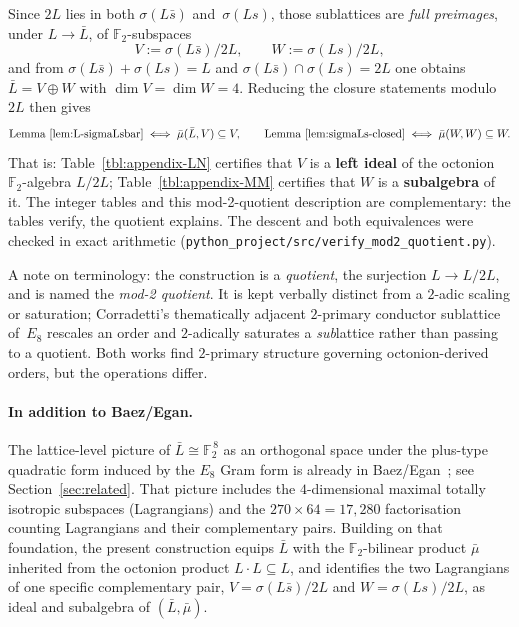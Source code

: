 \documentclass[twoside,english]{paper}
\numberwithin{equation}{section}
\numberwithin{figure}{section}
\theoremstyle{definition}
\theoremstyle{remark}
\newcommand{\FF}{\mathbb{F}}
\begin{document}
Since $2L$ lies in both $\sigma(L\bar s)$ and~$\sigma(Ls)$, those
sublattices are \emph{full preimages}, under $L \to \bar L$, of
$\FF_2$-subspaces
\[
  V := \sigma(L\bar s)/2L, \qquad W := \sigma(Ls)/2L,
\]
and from $\sigma(L\bar s) + \sigma(Ls) = L$ and
$\sigma(L\bar s) \cap \sigma(Ls) = 2L$ one obtains $\bar L = V \oplus
W$ with $\dim V = \dim W = 4$.  Reducing the closure statements
modulo~$2L$ then gives
\[
  \text{Lemma~\ref{lem:L-sigmaLsbar}} \iff
    \bar\mu(\bar L, V) \subseteq V, \qquad
  \text{Lemma~\ref{lem:sigmaLs-closed}} \iff
    \bar\mu(W, W) \subseteq W.
\]
That is: Table~\ref{tbl:appendix-LN} certifies that $V$ is a
\textbf{left ideal} of the octonion $\FF_2$-algebra $L/2L$;
Table~\ref{tbl:appendix-MM} certifies that $W$ is a
\textbf{subalgebra} of it.  The integer tables and this mod-2-quotient
description are complementary: the tables verify, the quotient
explains.  The descent and both equivalences were checked in exact
arithmetic
(\texttt{python\_project/src/verify\_mod2\_quotient.py}).

A note on terminology: the construction is a \emph{quotient}, the
surjection $L \to L/2L$, and is named the \emph{mod-2 quotient}.  It
is kept verbally distinct from a $2$-adic scaling or saturation;
Corradetti's \cite{Corradetti2026} thematically adjacent $2$-primary
conductor sublattice of~$E_8$ rescales an order and $2$-adically
saturates a \emph{sub}lattice rather than passing to a quotient.
Both works find $2$-primary structure governing octonion-derived
orders, but the operations differ.

\paragraph{In addition to Baez/Egan.}
The lattice-level picture of $\bar L \cong \FF_2^{\,8}$ as an
orthogonal space under the plus-type quadratic form induced by the
$E_8$ Gram form is already in Baez/Egan~\cite{Baez2014}; see
Section~\ref{sec:related}.  That picture includes the
$4$-dimensional maximal totally isotropic subspaces (Lagrangians)
and the $270 \times 64 = 17{,}280$ factorisation counting
Lagrangians and their complementary pairs.  Building on that
foundation, the present construction equips $\bar L$ with the
$\FF_2$-bilinear product $\bar\mu$ inherited from the octonion
product $L \cdot L \subseteq L$, and identifies the two Lagrangians
of one specific complementary pair, $V = \sigma(L\bar s)/2L$ and
$W = \sigma(Ls)/2L$, as ideal and subalgebra of
$(\bar L, \bar\mu)$.
\end{document}

